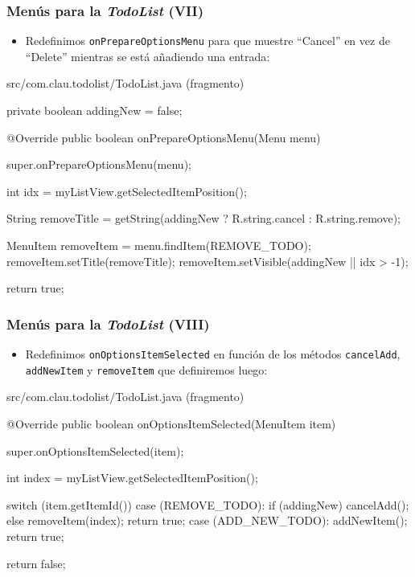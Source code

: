 \documentclass[hyperref={pdfpagelabels=true},ucs]{beamer}
\begin{document}
\begin{frame}[fragile]
\frametitle{Menús para la \emph{TodoList} (VII)}

\begin{itemize}
\item Redefinimos \verb|onPrepareOptionsMenu| para que muestre
  ``Cancel'' en vez de ``Delete'' mientras se está añadiendo una
  entrada:
\end{itemize}

\begin{tiny}
\begin{block}{src/com.clau.todolist/TodoList.java (fragmento)}
\begin{java}
private boolean addingNew = false;

@Override
public boolean onPrepareOptionsMenu(Menu menu) {
  super.onPrepareOptionsMenu(menu);

  int idx = myListView.getSelectedItemPosition();

  String removeTitle = getString(addingNew ?
                                 R.string.cancel : R.string.remove);

  MenuItem removeItem = menu.findItem(REMOVE_TODO);
  removeItem.setTitle(removeTitle);
  removeItem.setVisible(addingNew || idx > -1);

  return true;
}
\end{java}
\end{block}
\end{tiny}

\end{frame}



\begin{frame}[fragile,shrink=5]
\frametitle{Menús para la \emph{TodoList} (VIII)}

\begin{itemize}
\item Redefinimos \verb|onOptionsItemSelected| en función de los
  métodos \verb|cancelAdd|, \verb|addNewItem| y \verb|removeItem| que
  definiremos luego:
\end{itemize}

\begin{tiny}
\begin{block}{src/com.clau.todolist/TodoList.java (fragmento)}
\begin{java}
@Override
public boolean onOptionsItemSelected(MenuItem item) {
  super.onOptionsItemSelected(item);

  int index = myListView.getSelectedItemPosition();

  switch (item.getItemId()) {
    case (REMOVE_TODO): {
      if (addingNew) {
        cancelAdd();
      }
      else {
        removeItem(index);
      }
      return true;
    }
    case (ADD_NEW_TODO): {
      addNewItem();
      return true;
    }
  }

  return false;
}
\end{java}
\end{block}
\end{tiny}

\end{frame}
\end{document}

